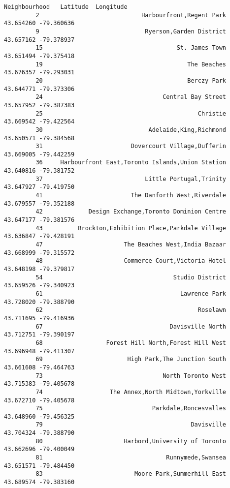 \documentclass[11pt]{article}
\begin{document}
\begin{Verbatim}[commandchars=\\\{\}]
                                                  Neighbourhood   Latitude  Longitude  
         2                             Harbourfront,Regent Park  43.654260 -79.360636  
         9                              Ryerson,Garden District  43.657162 -79.378937  
         15                                      St. James Town  43.651494 -79.375418  
         19                                         The Beaches  43.676357 -79.293031  
         20                                         Berczy Park  43.644771 -79.373306  
         24                                  Central Bay Street  43.657952 -79.387383  
         25                                            Christie  43.669542 -79.422564  
         30                              Adelaide,King,Richmond  43.650571 -79.384568  
         31                         Dovercourt Village,Dufferin  43.669005 -79.442259  
         36     Harbourfront East,Toronto Islands,Union Station  43.640816 -79.381752  
         37                             Little Portugal,Trinity  43.647927 -79.419750  
         41                         The Danforth West,Riverdale  43.679557 -79.352188  
         42             Design Exchange,Toronto Dominion Centre  43.647177 -79.381576  
         43          Brockton,Exhibition Place,Parkdale Village  43.636847 -79.428191  
         47                       The Beaches West,India Bazaar  43.668999 -79.315572  
         48                       Commerce Court,Victoria Hotel  43.648198 -79.379817  
         54                                     Studio District  43.659526 -79.340923  
         61                                       Lawrence Park  43.728020 -79.388790  
         62                                            Roselawn  43.711695 -79.416936  
         67                                    Davisville North  43.712751 -79.390197  
         68                  Forest Hill North,Forest Hill West  43.696948 -79.411307  
         69                        High Park,The Junction South  43.661608 -79.464763  
         73                                  North Toronto West  43.715383 -79.405678  
         74                   The Annex,North Midtown,Yorkville  43.672710 -79.405678  
         75                               Parkdale,Roncesvalles  43.648960 -79.456325  
         79                                          Davisville  43.704324 -79.388790  
         80                       Harbord,University of Toronto  43.662696 -79.400049  
         81                                   Runnymede,Swansea  43.651571 -79.484450  
         83                          Moore Park,Summerhill East  43.689574 -79.383160  

\end{Verbatim}
\end{document}
